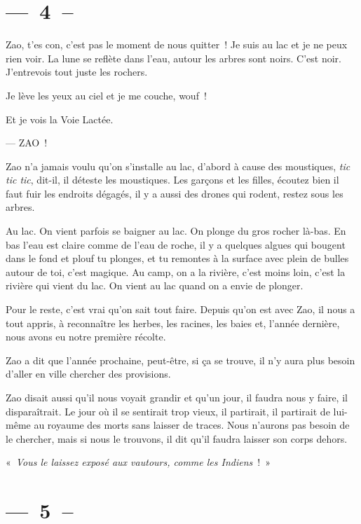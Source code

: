 \documentclass[french,twoside]{book} %
\begin{document}
\section[{— 4 –}]{— 4 –}\renewcommand{\leftmark}{— 4 –}

\noindent Zao, t’es con, c’est pas le moment de nous quitter ! Je suis au lac et je ne peux rien voir. La lune se reflète dans l’eau, autour les arbres sont noirs. C’est noir. J’entrevois tout juste les rochers.\par
Je lève les yeux au ciel et je me couche, wouf !\par
Et je vois la Voie Lactée.\par
— ZAO !\par
\bigbreak
\noindent Zao n’a jamais voulu qu’on s’installe au lac, d’abord à cause des moustiques, \emph{tic tic tic}, dit-il, il déteste les moustiques. Les garçons et les filles, écoutez bien il faut fuir les endroits dégagés, il y a aussi des drones qui rodent, restez sous les arbres.\par
Au lac. On vient parfois se baigner au lac. On plonge du gros rocher là-bas. En bas l’eau est claire comme de l’eau de roche, il y a quelques algues qui bougent dans le fond et plouf tu plonges, et tu remontes à la surface avec plein de bulles autour de toi, c’est magique. Au camp, on a la rivière, c’est moins loin, c’est la rivière qui vient du lac. On vient au lac quand on a envie de plonger.\par
Pour le reste, c’est vrai qu’on sait tout faire. Depuis qu’on est avec Zao, il nous a tout appris, à reconnaître les herbes, les racines, les baies et, l’année dernière, nous avons eu notre première récolte.\par
Zao a dit que l’année prochaine, peut-être, si ça se trouve, il n’y aura plus besoin d’aller en ville chercher des provisions.\par
Zao disait aussi qu’il nous voyait grandir et qu’un jour, il faudra nous y faire, il disparaîtrait. Le jour où il se sentirait trop vieux, il partirait, il partirait de lui-même au royaume des morts sans laisser de traces. Nous n’aurons pas besoin de le chercher, mais si nous le trouvons, il dit qu’il faudra laisser son corps dehors.\par
« \emph{Vous le laissez exposé aux vautours, comme les Indiens} ! »
\section[{— 5 –}]{— 5 –}\renewcommand{\leftmark}{— 5 –}
\end{document}

